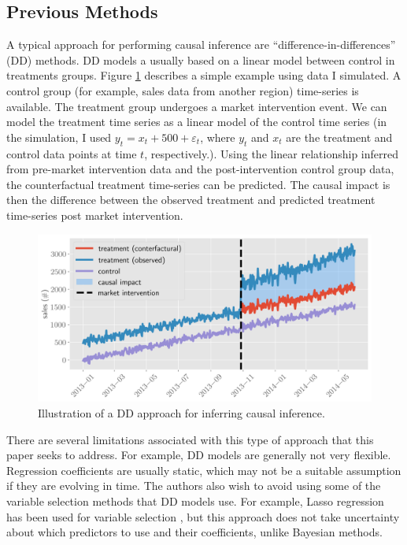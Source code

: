 \documentclass[12pt]{article}
\begin{document}
\subsection{Previous Methods}
A typical approach for performing causal inference are ``difference-in-differences'' (DD) methods. DD models a usually based on a linear model between control in treatments groups. Figure \ref{dd} describes a simple example using data I simulated. A control group (for example, sales data from another region) time-series is  available. The treatment group undergoes a  market intervention event. We can model the treatment time series as a linear model of the control time series (in the simulation, I used $y_t = x_t + 500 + \varepsilon_t$, where $y_t$ and $x_t$ are the treatment and control data points at time $t$, respectively.). Using the linear relationship inferred from pre-market intervention data and the post-intervention control group data, the counterfactual treatment time-series can be predicted. The causal impact is then the difference between the observed treatment and predicted treatment time-series post market intervention. 

\begin{figure}[!h]
    \centering
    \includegraphics[scale=.6
    ]{../figures/dd.png}
    \caption{Illustration of a DD approach for inferring causal inference. }
    \label{dd}
\end{figure}

There are several limitations associated with this type of approach that this paper seeks to address. For example, DD models are generally not very flexible. Regression coefficients are usually static, which may not be a suitable assumption if they are evolving in time. The authors also wish to avoid using some of the variable selection methods that DD models use. For example, Lasso regression has been used for variable selection \cite{belloni2015program}, but this approach does not take uncertainty about which predictors to use and their coefficients, unlike Bayesian methods.
\end{document}
